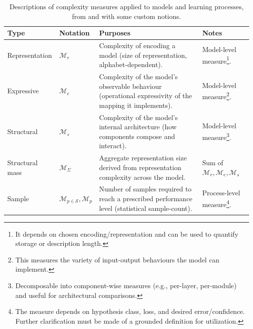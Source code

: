 \begin{table}[htb]
  \centering
  \footnotesize
  \begin{threeparttable}
    \caption{Descriptions of complexity measures applied to models and learning processes, from \cite{STL_Hajek_Maxim_2021,10.5555/2930837,10.5555/2371238,10.5555/200548} and \cite{Vapnik1999-VAPTNO} with some custom notions.}
    \label{tab:polynomial_test}
    \begin{tabularx}{\textwidth}{@{} L{0.2\textwidth}
                                     L{0.15\textwidth} 
                                     L{0.3\textwidth}
                                     >{\RaggedRight\arraybackslash}X @{}}
      \toprule
      \textbf{Type} & \textbf{Notation} & \textbf{Purposes} & \textbf{Notes} \\
      \midrule
      Representation
        & $\mathcal{M}_{r}$ 
        & Complexity of encoding a model (size of representation, alphabet-dependent).
        & Model-level measure\footnote{It depends on chosen encoding/representation and can be used to quantify storage or description length.}. \\
      \addlinespace[1pt]
      Expressive 
        & $\mathcal{M}_{e}$
        & Complexity of the model's observable behaviour (operational expressivity of the mapping it implements). 
        & Model-level measure\footnote{This measures the variety of input-output behaviours the model can implement.}.\\
      \addlinespace[1pt]
      Structural
        & $\mathcal{M}_{s}$
        & Complexity of the model's internal architecture (how components compose and interact).
        & Model-level measure\footnote{Decomposable into component-wise measures (e.g., per-layer, per-module) and useful for architectural comparisons.}.\\
      \addlinespace[1pt]
      Structural mass
        & $\mathcal{M}_{\Sigma}$
        & Aggregate representation size derived from representation complexity across the model.
        & Sum of $\mathcal{M}_{r},\mathcal{M}_{e},\mathcal{M}_{s}$\\
      \addlinespace[1pt]
      Sample
        & $\mathcal{M}_{p\in\mathcal{S}},\mathcal{M}_{p}$
        & Number of samples required to reach a prescribed performance level (statistical sample-count).
        &Process-level measure\footnote{The measure depends on hypothesis class, loss, and desired error/confidence. Further clarification must be made of a grounded definition for utilization.}.\\

\end{tabularx}
\end{threeparttable}
\end{table}

